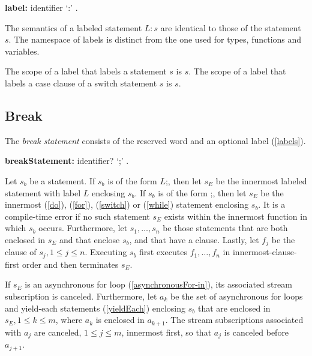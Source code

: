 \documentclass{article}
\newcommand{\code}[1]{{\sf #1}}
\begin{document}


 \begin{grammar}
{\bf label:}
      identifier `{\escapegrammar :}'
    .
 \end{grammar}

\LMHash{}
 The semantics of a labeled statement $L: s$ are identical to those of the statement $s$. The namespace of labels is distinct from the one used for types, functions and variables.

\LMHash{}
The scope of a label that labels a statement $s$ is $s$. The scope of a label that labels a case clause of a switch statement $s$ is $s$.



\subsection{ Break}

\LMHash{}
The {\em break statement} consists of the reserved word \BREAK{} and an optional label (\ref{labels}).

\begin{grammar}
{\bf breakStatement:}
     \BREAK{} identifier? `{\escapegrammar ;}'
    .
 \end{grammar}

\LMHash{}
Let $s_b$ be a \BREAK{} statement. If $s_b$ is of the form  \code{\BREAK{} $L$;}, then let $s_E$ be the innermost labeled statement with label $L$ enclosing $s_b$. If $s_b$ is of the form \code{\BREAK{};},  then let $s_E$ be the innermost  \DO{} (\ref{do}), \FOR{} (\ref{for}), \SWITCH{} (\ref{switch}) or \WHILE{} (\ref{while}) statement enclosing  $s_b$. It is a compile-time error if no such statement $s_E$ exists within the innermost function in which  $s_b$ occurs.  Furthermore, let $s_1, \ldots, s_n$ be those \TRY{} statements that are both enclosed in $s_E$ and that enclose  $s_b$, and that have a \FINALLY{} clause. Lastly, let $f_j$ be the \FINALLY{} clause of $s_j, 1 \le j \le n$.   Executing  $s_b$ first executes $f_1, \ldots,  f_n$ in innermost-clause-first  order and then terminates $s_E$.

\LMHash{}
If $s_E$ is an asynchronous for loop (\ref{asynchronousFor-in}), its associated stream subscription is canceled. Furthermore, let $a_k$ be the set of asynchronous for loops  and yield-each statements (\ref{yieldEach}) enclosing $s_b$ that are enclosed in $s_E , 1 \le k \le m$, where $a_k$ is enclosed in $a_{k+1}$.   The stream subscriptions associated with $a_j$ are canceled, $1 \le j \le m$, innermost first, so that $a_j$ is canceled before $a_{j+1}$.
\end{document}
